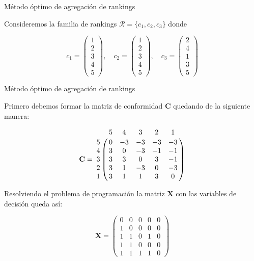 \documentclass[10pt]{beamer}
\begin{document}
	\begin{frame}{Método óptimo de agregación de rankings}
		\begin{ejemplo}
			Consideremos la familia de rankings $\mathcal{R} = \{c_1, c_2, c_3\}$ donde
			
			\begin{equation*}
			c_1 = \left( \begin{array}{c}
			1\\
			2\\
			3\\
			4\\
			5
			\end{array} \right), \quad
			c_2 = \left( \begin{array}{c}
			1\\
			2\\
			3\\
			4\\
			5
			\end{array} \right), \quad
			c_3 = \left( \begin{array}{c}
			2\\
			4\\
			1\\
			3\\
			5
			\end{array} \right)
			\end{equation*}
			
		\end{ejemplo}
	\end{frame}
	
	\begin{frame}{Método óptimo de agregación de rankings}
		\begin{ejemplo}[continuación]
			Primero debemos formar la matriz de conformidad $\mathbf{C}$ quedando de la siguiente manera:
					
			\begin{equation*}
			\mathbf{C} = \bordermatrix{
			  & 5 & 4 & 3 & 2 & 1 \cr
			5 & 0 & -3 & -3 & -3 & -3 \cr
			4 & 3 &  0 & -3 & -1 & -1 \cr
			3 & 3 &  3 &  0 &  3 & -1 \cr
			2 & 3 &  1 & -3 &  0 & -3 \cr
			1 & 3 &  1 &  1	&  3 &	0 \cr
			}
			\end{equation*}
			
			Resolviendo el problema de programación la matriz $\mathbf{X}$ con las variables de decisión queda así:
			
			\begin{equation*}
			\mathbf{X} = \left(\begin{array}{rrrrr}
			0 & 0 & 0 & 0 & 0 \\
			1 & 0 & 0 & 0 & 0 \\
			1 & 1 & 0 & 1 & 0 \\
			1 & 1 & 0 & 0 & 0 \\
			1 & 1 & 1 & 1 &	0
			\end{array}\right)
			\end{equation*}
			
			
		\end{ejemplo}
	\end{frame}
	
\end{document}
